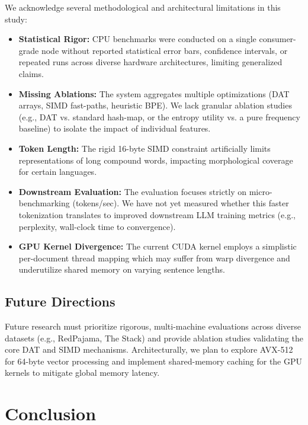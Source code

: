 \documentclass[11pt,a4paper,twocolumn]{article}
\begin{document}
We acknowledge several methodological and architectural limitations in this study:
\begin{itemize}
    \item \textbf{Statistical Rigor:} CPU benchmarks were conducted on a single consumer-grade node without reported statistical error bars, confidence intervals, or repeated runs across diverse hardware architectures, limiting generalized claims.
    \item \textbf{Missing Ablations:} The system aggregates multiple optimizations (DAT arrays, SIMD fast-paths, heuristic BPE). We lack granular ablation studies (e.g., DAT vs. standard hash-map, or the entropy utility vs. a pure frequency baseline) to isolate the impact of individual features.
    \item \textbf{Token Length:} The rigid 16-byte SIMD constraint artificially limits representations of long compound words, impacting morphological coverage for certain languages.
    \item \textbf{Downstream Evaluation:} The evaluation focuses strictly on micro-benchmarking (tokens/sec). We have not yet measured whether this faster tokenization translates to improved downstream LLM training metrics (e.g., perplexity, wall-clock time to convergence).
    \item \textbf{GPU Kernel Divergence:} The current CUDA kernel employs a simplistic per-document thread mapping which may suffer from warp divergence and underutilize shared memory on varying sentence lengths.
\end{itemize}

\subsection{Future Directions}

Future research must prioritize rigorous, multi-machine evaluations across diverse datasets (e.g., RedPajama, The Stack) and provide ablation studies validating the core DAT and SIMD mechanisms. Architecturally, we plan to explore AVX-512 for 64-byte vector processing and implement shared-memory caching for the GPU kernels to mitigate global memory latency.

\section{Conclusion}
\label{sec:conclusion}
\end{document}
